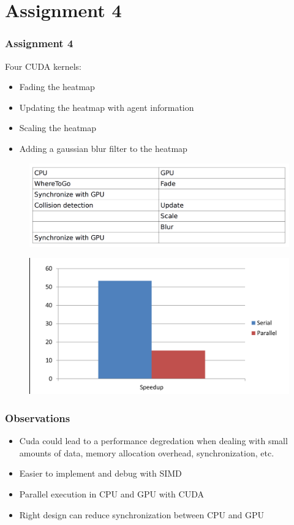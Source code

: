 \documentclass{beamer}
\begin{document}
\section{Assignment 4}
\begin{frame}
	\frametitle{Assignment 4}
	Four CUDA kernels:
	\begin{itemize}
	\item
	Fading the heatmap 
	\item
	Updating the heatmap with agent information
	\item
	Scaling the heatmap
	\item
	Adding a gaussian blur filter to the heatmap
	\end{itemize}
\end{frame}

\begin{frame}
	\begin{figure}[h!]
	\includegraphics[width=\textwidth]{lab4graph1.png}
	\end{figure}
\end{frame}

\begin{frame}
	\begin{figure}[h!]
	\includegraphics[width=\textwidth]{lab4graph2.png}
	\end{figure}
\end{frame}
\begin{frame}
	\frametitle{Observations}
	\begin{itemize}
	\item
	Cuda could lead to a performance degredation when dealing with small amounts of data, memory allocation overhead, synchronization, etc.
	\item
	Easier to implement and debug with SIMD
	\item
	Parallel execution in CPU and GPU with CUDA
	\item
	Right design can reduce synchronization between CPU and GPU
	\end{itemize}
\end{frame}

\begin{frame}[plain]
	\begin{centering}
	\par
	\end{centering}
\end{frame}
\end{document}
